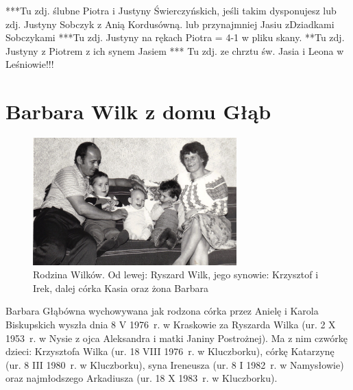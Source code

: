 ***Tu zdj. ślubne Piotra i Justyny Świerczyńskich, jeśli takim dysponujesz lub zdj. Justyny Sobczyk z Anią Kordusówną. lub przynajmniej Jasiu zDziadkami Sobczykami
***Tu zdj. Justyny na rękach Piotra = 4-1 w pliku skany.
**Tu zdj. Justyny z Piotrem z ich synem Jasiem
*** Tu zdj. ze chrztu św. Jasia i Leona w Leśniowie!!!



\section{Barbara Wilk z domu Głąb}

\begin{figure}
\begin{center}
\includegraphics[width=0.7\textwidth]{zdjecia/barbara_i_ryszard_wilk_z_dziecmi.jpg}
\caption[Barbara i Ryszard Wilkowie z dziećmi]{Rodzina Wilków. Od lewej: Ryszard Wilk, jego synowie: Krzysztof i Irek, dalej córka Kasia oraz żona Barbara}
\label{rys:barbara_i_ryszard_wilk_z_dziecmi}
\end{center}
\end{figure}

Barbara Głąbówna wychowywana jak rodzona córka przez Anielę i Karola Biskupskich wyszła dnia 8 V 1976~r. w Kraskowie za Ryszarda Wilka (ur. 2 X 1953~r. w Nysie z ojca Aleksandra i matki Janiny Postrożnej). Ma z nim czwórkę dzieci: Krzysztofa Wilka (ur. 18 VIII 1976~r. w Kluczborku), córkę Katarzynę (ur. 8 III 1980~r. w Kluczborku), syna Ireneusza (ur. 8 I 1982~r. w Namysłowie) oraz najmłodszego Arkadiusza (ur. 18 X 1983~r. w Kluczborku).

